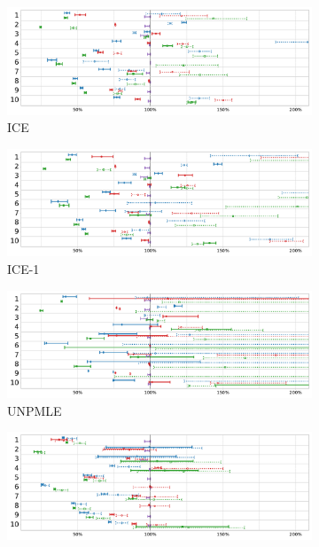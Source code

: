 \documentclass[sigconf,review,anonymous]{acmart}
\newcommand{\ICE}{ICE\xspace}
\newcommand{\improvedICE}{ICE-1\xspace}
\newcommand{\Unpmle}{UNPMLE\xspace}
\begin{document}
\begin{figure}
\begin{subfigure}{.49\textwidth}
      \includegraphics[width=0.95\linewidth]{charts/ggplot/estimators-no-title/ICE.pdf}
\vspace*{-3mm}
\caption{\ICE}
\end{subfigure}
\begin{subfigure}{.49\textwidth}
    \centering
      \includegraphics[width=0.95\linewidth]{charts/ggplot/estimators-no-title/ICE-1.pdf}
\vspace*{-3mm}
\caption{\improvedICE}
\end{subfigure}
\begin{subfigure}{.49\textwidth}
    \centering
      \includegraphics[width=0.95\linewidth]{charts/ggplot/estimators-no-title/Unpmle.pdf}
\vspace*{-3mm}
\caption{\Unpmle}
\end{subfigure}
\begin{subfigure}{.49\textwidth}
    \centering
      \includegraphics[width=0.95\linewidth]{charts/ggplot/estimators-no-title/Bootstrap.pdf}

\end{subfigure}
\end{figure}
\end{document}
